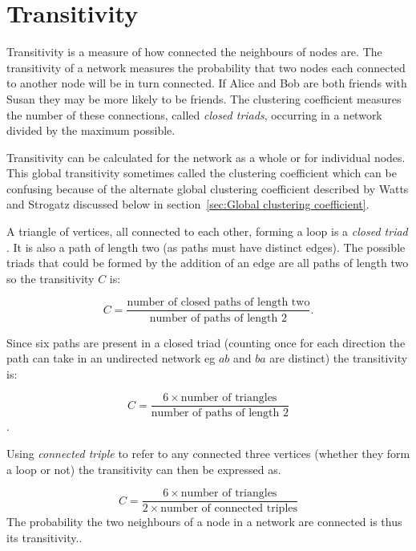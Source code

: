 



\section{Transitivity}
\label{sec:transitivity}
Transitivity is a measure of how connected the neighbours of nodes are. 
The transitivity of a network measures the probability that two nodes each connected to another node will be in turn connected. If Alice and Bob are both friends with Susan they may be more likely to be friends. The clustering coefficient measures the number of these connections, called \textit{closed triads}, occurring in a network 
divided by the maximum possible.

Transitivity can be calculated for the network as a whole or for individual nodes. This global transitivity sometimes called the clustering coefficient which can be confusing because of the alternate global clustering coefficient described by Watts and Strogatz \cite{watts1998collective} discussed below in section~\ref{sec:Global clustering coefficient}. 

A triangle of vertices,  all connected to each other, forming a loop is  a \textit{closed triad} \cite{newman2018networks}. It is also a path of length two (as paths must have distinct edges). The possible triads that could be formed by the addition of an edge are all paths of length two so the transitivity $C$ is:

\begin{equation}
    C = \frac{\textrm{number of closed paths of length two}}{\textrm{number of paths of length 2}}.
\end{equation}

Since six paths are present in a closed triad (counting once for each direction the path can take in an undirected network eg $ab$ and $ba$ are distinct) the transitivity is:

\begin{equation}
    C = \frac{6 \times \textrm{number of triangles}}{\textrm{number of paths of length 2}}
\end{equation}.

Using \textit{connected triple} to refer to any connected three vertices (whether they form a loop or not) the transitivity can then be expressed as.

\begin{equation}
    C = \frac{6 \times \textrm{number of triangles}}{2 \times \textrm{number of connected triples}}
\end{equation}
The probability the two neighbours of a node in a network are connected is thus its transitivity.\cite{newman2018networks}. 

